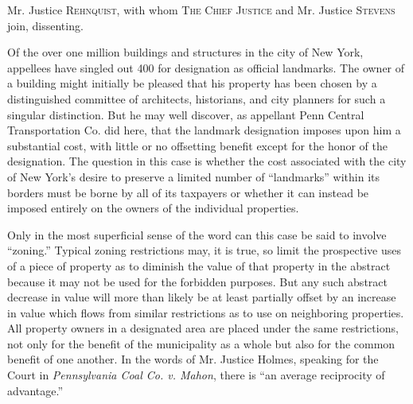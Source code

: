 \opinion Mr. Justice \textsc{Rehnquist}, with whom \textsc{The Chief Justice}
and Mr. Justice \textsc{Stevens} join, dissenting.

Of the over one million buildings and structures in the city of New York,
appellees have singled out 400 for designation as official landmarks. The owner
of a building might initially be pleased that his property has been chosen by a
distinguished committee of architects, historians, and city planners for such a
singular distinction. But he may well discover, as appellant Penn Central
Transportation Co. did here, that the landmark designation imposes upon him a
substantial cost, with little or no offsetting benefit except for the honor of
the designation. The question in this case is whether the cost associated with
the city of New York's desire to preserve a limited number of ``landmarks''
within its borders must be borne by all of its taxpayers or whether it can
instead be imposed entirely on the owners of the individual properties.

Only in the most superficial sense of the word can this case be said to involve
``zoning.'' Typical zoning restrictions may, it is true, so limit the
prospective uses of a piece of property as to diminish the value of that
property in the abstract because it may not be used for the forbidden purposes.
But any such abstract decrease in value will more than likely be at least
partially offset by an increase in value which flows from similar restrictions
as to use on neighboring properties. All property owners in a designated area
are placed under the same restrictions, not only for the benefit of the
municipality as a whole but also for the common benefit of one another. In the
words of Mr. Justice Holmes, speaking for the Court in \textit{Pennsylvania Coal
Co. v. Mahon}, there is ``an average reciprocity of advantage.''

